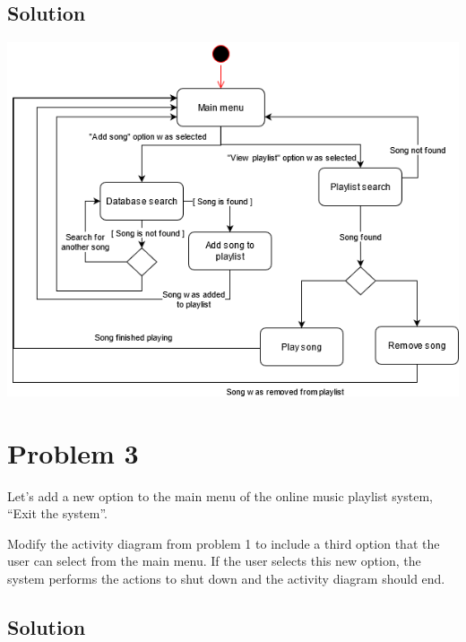 \documentclass{article}
\begin{document}
    \subsection*{Solution}

    \begin{center}
        \includegraphics[scale=0.55]{Problem2.png}
    \end{center}



    \section*{Problem 3}

    Let’s add a new option to the main menu of the online music playlist system, “Exit the
    system”.

    Modify the activity diagram from problem 1 to include a third option that the user can
    select from the main menu. If the user selects this new option, the system performs the
    actions to shut down and the activity diagram should end.

    \subsection*{Solution}
\end{document}
